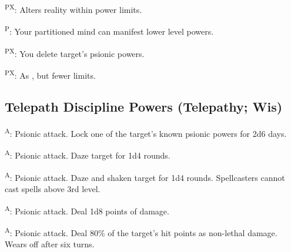 \begin{enumerate*}
\item {}\textsuperscript{PX}: Alters reality within power limits. %

      \textsuperscript{P}: Your partitioned mind can manifest lower level powers. %

\item {}\textsuperscript{PX}: You delete target's psionic powers. %

      \textsuperscript{PX}: As , but fewer limits. %
\end{enumerate*}



\subsection{Telepath Discipline Powers {\normalsize(Telepathy; Wis)}}
\begin{enumerate*}
\item {}\textsuperscript{A}: Psionic attack. Lock one of the target's known psionic powers for 2d6 days.
\item {}\textsuperscript{A}: Psionic attack. Daze target for 1d4 rounds.
\item {}\textsuperscript{A}: Psionic attack. Daze and shaken target for 1d4 rounds. Spellcasters cannot cast spells above 3rd level.
\item {}\textsuperscript{A}: Psionic attack. Deal 1d8 points of damage.
\item {}\textsuperscript{A}: Psionic attack. Deal 80\% of the target's hit points as non-lethal damage. Wears off after six turns.
\item
\item
\item
\item
\end{enumerate*}